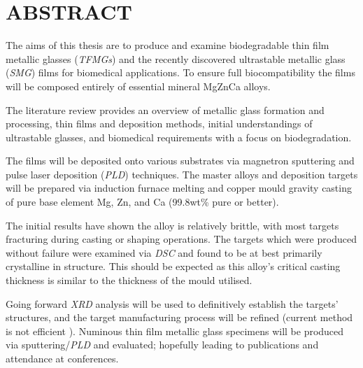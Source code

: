 \section{ABSTRACT}
 
The aims of this thesis are to produce and examine biodegradable thin film metallic glasses (\textit{TFMGs}) and the recently discovered ultrastable metallic glass (\textit{SMG}) films for biomedical applications. To ensure full biocompatibility the films will be composed entirely of essential mineral MgZnCa alloys.

The literature review provides an overview of metallic glass formation and processing, thin films and deposition methods, initial understandings of ultrastable glasses, and biomedical requirements with a focus on biodegradation. 

The films will be deposited onto various substrates via magnetron sputtering and pulse laser deposition (\textit{PLD}) techniques. The master alloys and deposition targets will be prepared via induction furnace melting and copper mould gravity casting of pure base element Mg, Zn, and Ca (99.8wt\% pure or better).

The initial results have shown the \MgZnCa alloy is relatively brittle, with most targets fracturing during casting or shaping operations. The targets which were produced without failure were examined via \textit{DSC} and found to be at best primarily crystalline in structure. This should be expected as this alloy’s critical casting thickness is similar to the thickness of the mould utilised. 

Going forward \textit{XRD} analysis will be used to definitively establish the targets’ structures, and the target manufacturing process will be refined (current method is not efficient ). Numinous thin film metallic glass specimens will be produced via sputtering/\textit{PLD} and evaluated; hopefully leading to publications and attendance at conferences. 